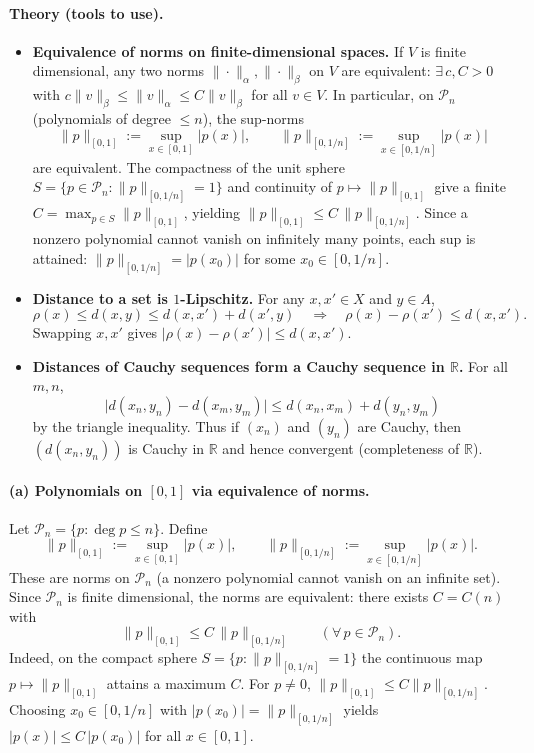 \documentclass[12pt,a4paper]{article}
\theoremstyle{plain}
\theoremstyle{definition}
\theoremstyle{remark}
\theoremstyle{remark}
\begin{document}
\paragraph{Theory (tools to use).}
\begin{itemize}
	\item \textbf{Equivalence of norms on finite-dimensional spaces.}
	If $V$ is finite dimensional, any two norms $\|\cdot\|_\alpha,\|\cdot\|_\beta$ on $V$ are equivalent:  
	$\exists\,c,C>0$ with $c\|v\|_\beta \le \|v\|_\alpha \le C\|v\|_\beta$ for all $v\in V$.
	In particular, on $\mathcal P_n$ (polynomials of degree $\le n$), the sup-norms
	\[
	\|p\|_{[0,1]}:=\sup_{x\in[0,1]}|p(x)|, \qquad
	\|p\|_{[0,1/n]}:=\sup_{x\in[0,1/n]}|p(x)|
	\]
	are equivalent. The compactness of the unit sphere
	$S=\{p\in\mathcal P_n:\|p\|_{[0,1/n]}=1\}$ and continuity of $p\mapsto \|p\|_{[0,1]}$
	give a finite $C=\max_{p\in S}\|p\|_{[0,1]}$, yielding
	$\|p\|_{[0,1]}\le C\,\|p\|_{[0,1/n]}$.
	Since a nonzero polynomial cannot vanish on infinitely many points, each sup is attained:
	$\|p\|_{[0,1/n]}=|p(x_0)|$ for some $x_0\in[0,1/n]$.
	
	\item \textbf{Distance to a set is $1$-Lipschitz.}
	For any $x,x'\in X$ and $y\in A$,
	\[
	\rho(x)\le d(x,y)\le d(x,x')+d(x',y)\quad\Rightarrow\quad
	\rho(x)-\rho(x')\le d(x,x').
	\]
	Swapping $x,x'$ gives $|\rho(x)-\rho(x')|\le d(x,x')$.
	
	\item \textbf{Distances of Cauchy sequences form a Cauchy sequence in $\mathbb R$.}
	For all $m,n$,
	\[
	\big|d(x_n,y_n)-d(x_m,y_m)\big|
	\le d(x_n,x_m)+d(y_n,y_m)
	\]
	by the triangle inequality. Thus if $(x_n)$ and $(y_n)$ are Cauchy, then $(d(x_n,y_n))$ is Cauchy in
	$\mathbb R$ and hence convergent (completeness of $\mathbb R$).
\end{itemize}

\paragraph{(a) Polynomials on $[0,1]$ via equivalence of norms.}
Let $\mathcal P_n=\{p:\deg p\le n\}$. Define
\[
\|p\|_{[0,1]}:=\sup_{x\in[0,1]}|p(x)|,\qquad
\|p\|_{[0,1/n]}:=\sup_{x\in[0,1/n]}|p(x)|.
\]
These are norms on $\mathcal P_n$ (a nonzero polynomial cannot vanish on an infinite set).
Since $\mathcal P_n$ is finite dimensional, the norms are equivalent: there exists $C=C(n)$ with
\[
\|p\|_{[0,1]}\le C\,\|p\|_{[0,1/n]}\qquad(\forall\,p\in\mathcal P_n).
\]
Indeed, on the compact sphere $S=\{p:\|p\|_{[0,1/n]}=1\}$ the continuous map
$p\mapsto \|p\|_{[0,1]}$ attains a maximum $C$. For $p\ne0$,
$\|p\|_{[0,1]}\le C\|p\|_{[0,1/n]}$. Choosing $x_0\in[0,1/n]$ with
$|p(x_0)|=\|p\|_{[0,1/n]}$ yields $|p(x)|\le C\,|p(x_0)|$ for all $x\in[0,1]$.
\end{document}
